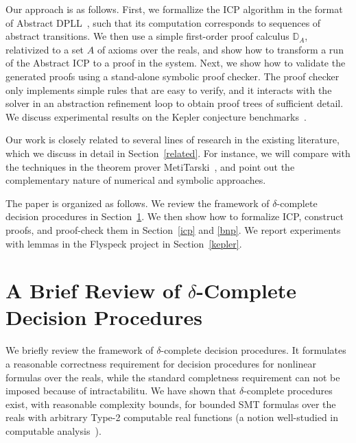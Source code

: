 \documentclass[envcountsect]{llncs}
\begin{document}
Our approach is as follows. First, we formallize the ICP algorithm in the
format of Abstract DPLL~\cite{}, such that its computation corresponds to
sequences of abstract transitions. We then use a simple first-order proof
calculus $\mathbb{D}_A$, relativized to a set $A$ of axioms over the reals, and
show how to transform a run of the Abstract ICP to a proof in the system. Next,
we show how to validate the generated proofs using a stand-alone symbolic proof
checker. The proof checker only implements simple rules that are easy to verify,
and it interacts with the solver in an abstraction refinement loop to obtain
proof trees of sufficient detail. We discuss experimental results on the Kepler
conjecture benchmarks~\cite{}. 

Our work is closely related to several lines
of research in the existing literature, which we discuss in detail in
Section~\ref{related}. For instance, we will compare with the techniques
in the theorem prover MetiTarski~\cite{}, and point out the
complementary nature of numerical and symbolic approaches. 

The paper is organized as follows. We review the framework of $\delta$-complete
decision procedures in Section~\ref{review}. We then show how to formalize ICP, 
construct proofs, and proof-check them in Section~\ref{icp} and \ref{bnp}. We
report experiments with lemmas in the Flyspeck project in Section~\ref{kepler}.


\section{A Brief Review of $\delta$-Complete Decision Procedures}\label{review}

We briefly review the framework of $\delta$-complete decision procedures.
It formulates a reasonable correctness requirement for decision
procedures for nonlinear
formulas over the reals, while the standard completness requirement can not be
imposed because of intractabilitu. We have shown that $\delta$-complete
procedures exist,
with reasonable complexity bounds, for bounded SMT formulas over the reals with
arbitrary Type-2 computable real functions (a notion well-studied in computable
analysis~\cite{}). 
\end{document}
